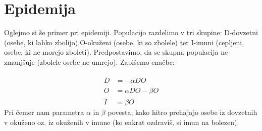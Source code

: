 \documentclass[slovene,11pt,a4paper]{article}
\numberwithin{equation}{section} %
\numberwithin{figure}{section} %
\numberwithin{table}{section} %
\begin{document}
\section{Epidemija}
Oglejmo si še primer pri epidemiji. Populacijo razdelimo v tri skupine: D-dovzetni (osebe, ki lahko zbolijo),O-okuženi (osebe, ki so zbolele) ter I-imuni (cepljeni, osebe, ki ne morejo zboleti). Predpostavimo, da se skupna populacija ne zmanjšuje (zbolele osebe ne umrejo). Zapišemo enačbe:

\begin{equation}
\label{eq-epidemija-osnovna}
\begin{aligned}
\dot{D}&=- \alpha D O \\
\dot{O}&= \alpha D O - \beta O \\
\dot{I}&= \beta O
\end{aligned}
\end{equation}
Pri čemer nam parametra $\alpha$ in $\beta$ povesta, kako hitro prehajajo osebe iz dovzetnih v okuženo oz. iz okuženih v imune (ko enkrat ozdraviš, si imun na bolezen). 
\end{document}
